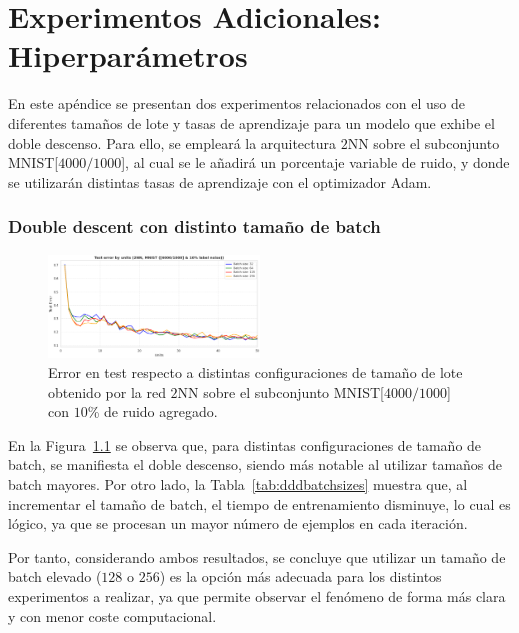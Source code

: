
\chapter{Experimentos Adicionales: Hiperparámetros}\label{ap:apendiceB}

En este apéndice se presentan dos experimentos relacionados con el uso de diferentes tamaños de lote y tasas de aprendizaje para un modelo que exhibe el doble descenso. Para ello, se empleará la arquitectura $2$NN sobre el subconjunto MNIST[$4000/1000$], al cual se le añadirá un porcentaje variable de ruido, y donde se utilizarán distintas tasas de aprendizaje con el optimizador Adam.\newline
 
\subsection*{Double descent con distinto tamaño de batch}

\begin{figure}[h!]
    \centering
    \includegraphics[width=0.5\textwidth]{img/experiments/batch_sizes_ddd.png}
    \caption[Doble descenso para distintos tamaños de lote.]{Error en test respecto a distintas configuraciones de tamaño de lote obtenido por la red $2$NN sobre el subconjunto MNIST[$4000/1000$] con $10$\% de ruido agregado.}\label{fig:dddbatchsizes}
\end{figure}

En la Figura~\ref{fig:dddbatchsizes} se observa que, para distintas configuraciones de tamaño de batch, se manifiesta el doble descenso, siendo más notable al utilizar tamaños de batch mayores. Por otro lado, la Tabla~\ref{tab:dddbatchsizes} muestra que, al incrementar el tamaño de batch, el tiempo de entrenamiento disminuye, lo cual es lógico, ya que se procesan un mayor número de ejemplos en cada iteración.\newline

Por tanto, considerando ambos resultados, se concluye que utilizar un tamaño de batch elevado ($128$ o $256$) es la opción más adecuada para los distintos experimentos a realizar, ya que permite observar el fenómeno de forma más clara y con menor coste computacional.\newline

